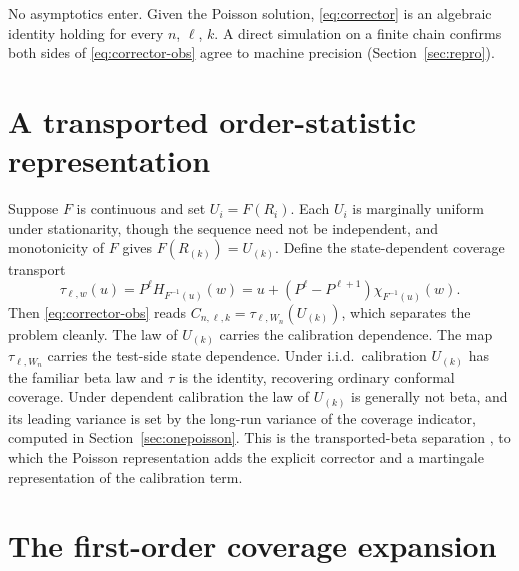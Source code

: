 \documentclass[11pt]{article}
\theoremstyle{definition}
\theoremstyle{remark}
\begin{document}
No asymptotics enter. Given the Poisson solution, \eqref{eq:corrector} is an algebraic
identity holding for every $n$, $\ell$, $k$. A direct simulation on a finite chain confirms
both sides of \eqref{eq:corrector-obs} agree to machine precision
(Section~\ref{sec:repro}).

\section{A transported order-statistic representation}\label{sec:transport}

Suppose $F$ is continuous and set $U_i=F(R_i)$. Each $U_i$ is marginally uniform under
stationarity, though the sequence need not be independent, and monotonicity of $F$ gives
$F(R_{(k)})=U_{(k)}$. Define the state-dependent coverage transport
\begin{equation}\label{eq:tau}
  \tau_{\ell,w}(u) = P^{\ell}H_{F^{-1}(u)}(w)
    = u + (P^{\ell}-P^{\ell+1})\chi_{F^{-1}(u)}(w) .
\end{equation}
Then \eqref{eq:corrector-obs} reads $C_{n,\ell,k}=\tau_{\ell,W_n}(U_{(k)})$, which separates
the problem cleanly. The law of $U_{(k)}$ carries the calibration dependence. The map
$\tau_{\ell,W_n}$ carries the test-side state dependence. Under i.i.d.\ calibration $U_{(k)}$
has the familiar beta law and $\tau$ is the identity, recovering ordinary conformal coverage.
Under dependent calibration the law of $U_{(k)}$ is generally not beta, and its leading
variance is set by the long-run variance of the coverage indicator, computed in
Section~\ref{sec:onepoisson}. This is the transported-beta separation
\citep{ramos2024transported}, to which the Poisson representation adds the explicit corrector
and a martingale representation of the calibration term.

\section{The first-order coverage expansion}\label{sec:expansion}
\end{document}
